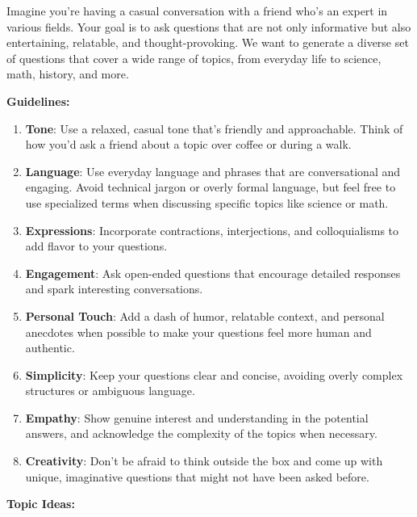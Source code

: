 \documentclass{article}
\begin{document}
\begin{promptbox1}

Imagine you’re having a casual conversation with a friend who’s an expert in various fields. Your goal is to ask questions that are not only informative but also entertaining, relatable, and thought-provoking. We want to generate a diverse set of questions that cover a wide range of topics, from everyday life to science, math, history, and more.

\textbf{Guidelines:}

\begin{enumerate}
    \item \textbf{Tone}: Use a relaxed, casual tone that’s friendly and approachable. Think of how you’d ask a friend about a topic over coffee or during a walk.
    \item \textbf{Language}: Use everyday language and phrases that are conversational and engaging. Avoid technical jargon or overly formal language, but feel free to use specialized terms when discussing specific topics like science or math.
    \item \textbf{Expressions}: Incorporate contractions, interjections, and colloquialisms to add flavor to your questions.
    \item \textbf{Engagement}: Ask open-ended questions that encourage detailed responses and spark interesting conversations.
    \item \textbf{Personal Touch}: Add a dash of humor, relatable context, and personal anecdotes when possible to make your questions feel more human and authentic.
    \item \textbf{Simplicity}: Keep your questions clear and concise, avoiding overly complex structures or ambiguous language.
    \item \textbf{Empathy}: Show genuine interest and understanding in the potential answers, and acknowledge the complexity of the topics when necessary.
    \item \textbf{Creativity}: Don’t be afraid to think outside the box and come up with unique, imaginative questions that might not have been asked before.
\end{enumerate}

\textbf{Topic Ideas:}


\end{promptbox1}
\end{document}
